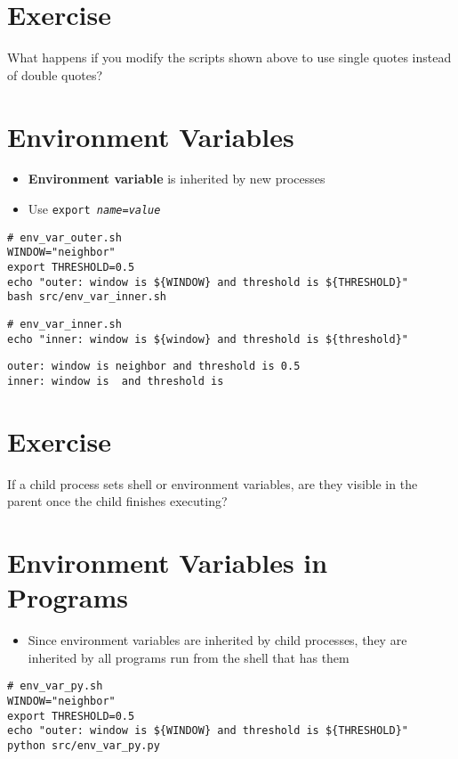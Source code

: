 \documentclass[krantzl]{krantz}
\newcommand{\glossref}[1]{\textbf{#1}}
\begin{document}
\section{Exercise}

What happens if you modify the scripts shown above
to use single quotes instead of double quotes?

\section{Environment Variables}
\begin{itemize}
\item \glossref{Environment variable} is inherited by new processes

\item Use \texttt{export \emph{name}=\emph{value}}

\end{itemize}
\begin{lstlisting}[frame=tblr]
# env_var_outer.sh
WINDOW="neighbor"
export THRESHOLD=0.5
echo "outer: window is ${WINDOW} and threshold is ${THRESHOLD}"
bash src/env_var_inner.sh
\end{lstlisting}

\begin{lstlisting}[frame=tblr]
# env_var_inner.sh
echo "inner: window is ${window} and threshold is ${threshold}"
\end{lstlisting}

\begin{lstlisting}[frame=tblr,backgroundcolor=\color{black!5}]
outer: window is neighbor and threshold is 0.5
inner: window is  and threshold is
\end{lstlisting}

\section{Exercise}

If a child process sets shell or environment variables,
are they visible in the parent once the child finishes executing?

\section{Environment Variables in Programs}
\begin{itemize}
\item Since environment variables are inherited by child processes,
    they are inherited by all programs run from the shell that has them

\end{itemize}
\begin{lstlisting}[frame=tblr]
# env_var_py.sh
WINDOW="neighbor"
export THRESHOLD=0.5
echo "outer: window is ${WINDOW} and threshold is ${THRESHOLD}"
python src/env_var_py.py
\end{lstlisting}
\end{document}
